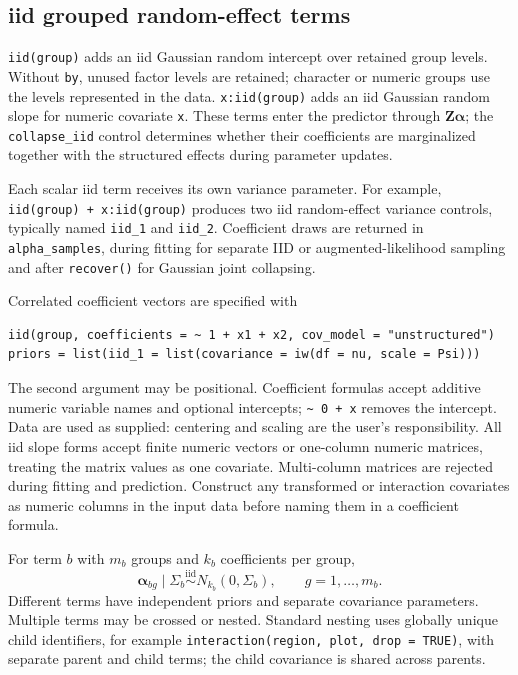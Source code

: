 \documentclass[11pt]{article}
\newcommand{\balpha}{\bm{\alpha}}
\newcommand{\bZ}{\bm{Z}}
\begin{document}
\subsection{iid grouped random-effect terms}

\texttt{iid(group)} adds an iid Gaussian random intercept over retained group levels. Without \texttt{by}, unused factor levels are retained; character or numeric groups use the levels represented in the data. \texttt{x:iid(group)} adds an iid Gaussian random slope for numeric covariate \texttt{x}. These terms enter the predictor through $\bZ\balpha$; the \texttt{collapse\_iid} control determines whether their coefficients are marginalized together with the structured effects during parameter updates.

Each scalar iid term receives its own variance parameter. For example, \texttt{iid(group) + x:iid(group)} produces two iid random-effect variance controls, typically named \texttt{iid\_1} and \texttt{iid\_2}. Coefficient draws are returned in \texttt{alpha\_samples}, during fitting for separate IID or augmented-likelihood sampling and after \texttt{recover()} for Gaussian joint collapsing.

Correlated coefficient vectors are specified with
\begin{verbatim}
iid(group, coefficients = ~ 1 + x1 + x2, cov_model = "unstructured")
priors = list(iid_1 = list(covariance = iw(df = nu, scale = Psi)))
\end{verbatim}
The second argument may be positional. Coefficient formulas accept additive numeric variable names and optional intercepts; \texttt{\textasciitilde{} 0 + x} removes the intercept. Data are used as supplied: centering and scaling are the user's responsibility. All iid slope forms accept finite numeric vectors or one-column numeric matrices, treating the matrix values as one covariate. Multi-column matrices are rejected during fitting and prediction. Construct any transformed or interaction covariates as numeric columns in the input data before naming them in a coefficient formula.

For term $b$ with $m_b$ groups and $k_b$ coefficients per group,
\begin{equation}
 \balpha_{bg}\mid\Sigma_b \stackrel{\mathrm{iid}}{\sim} N_{k_b}(0,\Sigma_b),
 \qquad g=1,\ldots,m_b.
\end{equation}
Different terms have independent priors and separate covariance parameters. Multiple terms may be crossed or nested. Standard nesting uses globally unique child identifiers, for example \texttt{interaction(region, plot, drop = TRUE)}, with separate parent and child terms; the child covariance is shared across parents.
\end{document}

